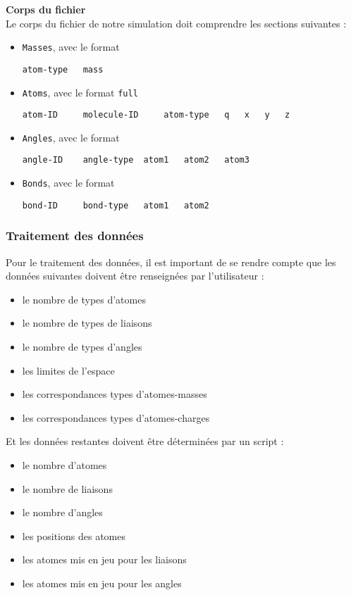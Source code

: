\textbf{Corps du fichier}\\
Le corps du fichier de notre simulation doit comprendre les sections suivantes :
\begin{itemize}
	\item \lstinline!Masses!, avec le format
\begin{lstlisting}
atom-type	mass
\end{lstlisting}
	\item \lstinline!Atoms!, avec le format \lstinline!full!
\begin{lstlisting}
atom-ID 	molecule-ID 	atom-type	q	x	y	z
\end{lstlisting}
	\item \lstinline!Angles!, avec le format
\begin{lstlisting}
angle-ID	angle-type	atom1	atom2	atom3
\end{lstlisting}
	\item \lstinline!Bonds!, avec le format
\begin{lstlisting}
bond-ID 	bond-type	atom1	atom2
\end{lstlisting}
\end{itemize}

	\subsubsection{Traitement des données}

Pour le traitement des données, il est important de se rendre compte que les données suivantes doivent être renseignées par l'utilisateur :
\begin{itemize}
	\item le nombre de types d'atomes
	\item le nombre de types de liaisons
	\item le nombre de types d'angles
	\item les limites de l'espace
	\item les correspondances types d'atomes-masses
	\item les correspondances types d'atomes-charges
\end{itemize}

Et les données restantes doivent être déterminées par un script :
\begin{itemize}
	\item le nombre d'atomes
	\item le nombre de liaisons
	\item le nombre d'angles
	\item les positions des atomes
	\item les atomes mis en jeu pour les liaisons
	\item les atomes mis en jeu pour les angles
\end{itemize}

